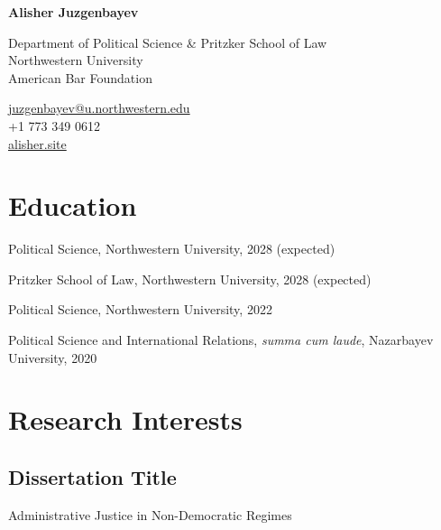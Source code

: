 \documentclass[11pt,letterpaper]{report}
\newcommand{\myname}{Alisher Juzgenbayev}
\newcommand{\namefont}[1]{{\normalfont\bfseries\Huge{#1}}}
\begin{document}
    \raggedright{}

    \namefont{\myname}

    \vspace{1em}
    \begin{minipage}[t]{0.700\textwidth}
        Department of Political Science \& Pritzker School of Law \\
        Northwestern University \\
        American Bar Foundation
    \end{minipage}
    \begin{minipage}[t]{0.295\textwidth}
        \raggedleft{}
        \href{mailto:juzgenbayev@u.northwestern.edu}{juzgenbayev@u.northwestern.edu} \\
        +1 773 349 0612 \\
        \href{https://alisher.site}{alisher.site}
    \end{minipage}


    \section*{Education}

    \begin{tablist}

        \item[Ph.D.] \tab{}Political Science, Northwestern University, 2028 (expected)
        \item[J.D.] \tab{}Pritzker School of Law, Northwestern University, 2028 (expected)
        \item[M.A.]  \tab{}Political Science, Northwestern University, 2022
        \item[B.A]  \tab{}Political Science and International Relations, \textit{summa cum laude}, Nazarbayev University, 2020

    \end{tablist}


 


    \section*{Research Interests}

    \subsection*{Dissertation Title}
    Administrative Justice in Non-Democratic Regimes
\end{document}
